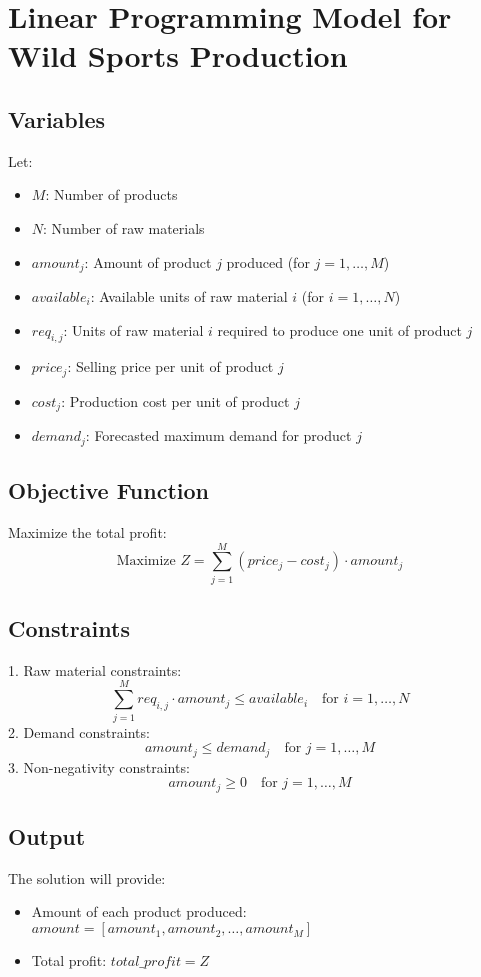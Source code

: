 \documentclass{article}
\begin{document}
\section*{Linear Programming Model for Wild Sports Production}

\subsection*{Variables}
Let:
\begin{itemize}
    \item $M$: Number of products
    \item $N$: Number of raw materials
    \item $amount_{j}$: Amount of product $j$ produced (for $j = 1, \ldots, M$)
    \item $available_{i}$: Available units of raw material $i$ (for $i = 1, \ldots, N$)
    \item $req_{i,j}$: Units of raw material $i$ required to produce one unit of product $j$
    \item $price_{j}$: Selling price per unit of product $j$
    \item $cost_{j}$: Production cost per unit of product $j$
    \item $demand_{j}$: Forecasted maximum demand for product $j$
\end{itemize}

\subsection*{Objective Function}
Maximize the total profit:
\[
\text{Maximize } Z = \sum_{j=1}^{M} (price_{j} - cost_{j}) \cdot amount_{j}
\]

\subsection*{Constraints}
1. Raw material constraints:
\[
\sum_{j=1}^{M} req_{i,j} \cdot amount_{j} \leq available_{i} \quad \text{for } i = 1, \ldots, N
\]
2. Demand constraints:
\[
amount_{j} \leq demand_{j} \quad \text{for } j = 1, \ldots, M
\]
3. Non-negativity constraints:
\[
amount_{j} \geq 0 \quad \text{for } j = 1, \ldots, M
\]

\subsection*{Output}
The solution will provide:
\begin{itemize}
    \item Amount of each product produced: $amount = [amount_{1}, amount_{2}, \ldots, amount_{M}]$
    \item Total profit: $total\_profit = Z$
\end{itemize}
\end{document}
